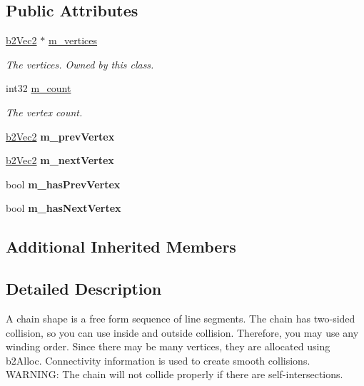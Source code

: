 \subsection*{Public Attributes}
\begin{DoxyCompactItemize}
\item 
\mbox{\label{classb2_chain_shape_a481116a6886fb3880b13e55c966579da}} 
\hyperlink{structb2_vec2}{b2\+Vec2} $\ast$ \hyperlink{classb2_chain_shape_a481116a6886fb3880b13e55c966579da}{m\+\_\+vertices}
\begin{DoxyCompactList}\small\item\em The vertices. Owned by this class. \end{DoxyCompactList}\item 
\mbox{\label{classb2_chain_shape_ab2ad711781e6ac81179074e90e0e058b}} 
int32 \hyperlink{classb2_chain_shape_ab2ad711781e6ac81179074e90e0e058b}{m\+\_\+count}
\begin{DoxyCompactList}\small\item\em The vertex count. \end{DoxyCompactList}\item 
\mbox{\label{classb2_chain_shape_a3a42d4c6b2421bc5badda3b6164949cf}} 
\hyperlink{structb2_vec2}{b2\+Vec2} {\bfseries m\+\_\+prev\+Vertex}
\item 
\mbox{\label{classb2_chain_shape_af3716ef780dd5bcd905e350d8854aaa2}} 
\hyperlink{structb2_vec2}{b2\+Vec2} {\bfseries m\+\_\+next\+Vertex}
\item 
\mbox{\label{classb2_chain_shape_a8a6ffbb9de0e2b8545c8b4fc8aa77249}} 
bool {\bfseries m\+\_\+has\+Prev\+Vertex}
\item 
\mbox{\label{classb2_chain_shape_a333b74486566e73c3cf1f7da5e69a96e}} 
bool {\bfseries m\+\_\+has\+Next\+Vertex}
\end{DoxyCompactItemize}
\subsection*{Additional Inherited Members}


\subsection{Detailed Description}
A chain shape is a free form sequence of line segments. The chain has two-\/sided collision, so you can use inside and outside collision. Therefore, you may use any winding order. Since there may be many vertices, they are allocated using b2\+Alloc. Connectivity information is used to create smooth collisions. W\+A\+R\+N\+I\+NG\+: The chain will not collide properly if there are self-\/intersections. 

